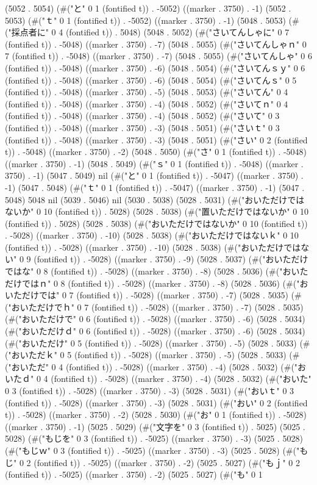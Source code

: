 {{(5052 . 5054) (#("と" 0 1 (fontified t)) . -5052) ((marker . 3750) . -1) (5052 . 5053) (#("ｔ" 0 1 (fontified t)) . -5052) ((marker . 3750) . -1) (5048 . 5053) (#("採点者に" 0 4 (fontified t)) . 5048) (5048 . 5052) (#("さいてんしゃに" 0 7 (fontified t)) . -5048) ((marker . 3750) . -7) (5048 . 5055) (#("さいてんしゃｎ" 0 7 (fontified t)) . -5048) ((marker . 3750) . -7) (5048 . 5055) (#("さいてんしゃ" 0 6 (fontified t)) . -5048) ((marker . 3750) . -6) (5048 . 5054) (#("さいてんｓｙ" 0 6 (fontified t)) . -5048) ((marker . 3750) . -6) (5048 . 5054) (#("さいてんｓ" 0 5 (fontified t)) . -5048) ((marker . 3750) . -5) (5048 . 5053) (#("さいてん" 0 4 (fontified t)) . -5048) ((marker . 3750) . -4) (5048 . 5052) (#("さいてｎ" 0 4 (fontified t)) . -5048) ((marker . 3750) . -4) (5048 . 5052) (#("さいて" 0 3 (fontified t)) . -5048) ((marker . 3750) . -3) (5048 . 5051) (#("さいｔ" 0 3 (fontified t)) . -5048) ((marker . 3750) . -3) (5048 . 5051) (#("さい" 0 2 (fontified t)) . -5048) ((marker . 3750) . -2) (5048 . 5050) (#("さ" 0 1 (fontified t)) . -5048) ((marker . 3750) . -1) (5048 . 5049) (#("ｓ" 0 1 (fontified t)) . -5048) ((marker . 3750) . -1) (5047 . 5049) nil (#("と" 0 1 (fontified t)) . -5047) ((marker . 3750) . -1) (5047 . 5048) (#("ｔ" 0 1 (fontified t)) . -5047) ((marker . 3750) . -1) (5047 . 5048) 5048 nil (5039 . 5046) nil (5030 . 5038) (5028 . 5031) (#("おいただけではないか" 0 10 (fontified t)) . 5028) (5028 . 5038) (#("置いただけではないか" 0 10 (fontified t)) . 5028) (5028 . 5038) (#("おいただけではないか" 0 10 (fontified t)) . -5028) ((marker . 3750) . -10) (5028 . 5038) (#("おいただけではないｋ" 0 10 (fontified t)) . -5028) ((marker . 3750) . -10) (5028 . 5038) (#("おいただけではない" 0 9 (fontified t)) . -5028) ((marker . 3750) . -9) (5028 . 5037) (#("おいただけではな" 0 8 (fontified t)) . -5028) ((marker . 3750) . -8) (5028 . 5036) (#("おいただけではｎ" 0 8 (fontified t)) . -5028) ((marker . 3750) . -8) (5028 . 5036) (#("おいただけでは" 0 7 (fontified t)) . -5028) ((marker . 3750) . -7) (5028 . 5035) (#("おいただけでｈ" 0 7 (fontified t)) . -5028) ((marker . 3750) . -7) (5028 . 5035) (#("おいただけで" 0 6 (fontified t)) . -5028) ((marker . 3750) . -6) (5028 . 5034) (#("おいただけｄ" 0 6 (fontified t)) . -5028) ((marker . 3750) . -6) (5028 . 5034) (#("おいただけ" 0 5 (fontified t)) . -5028) ((marker . 3750) . -5) (5028 . 5033) (#("おいただｋ" 0 5 (fontified t)) . -5028) ((marker . 3750) . -5) (5028 . 5033) (#("おいただ" 0 4 (fontified t)) . -5028) ((marker . 3750) . -4) (5028 . 5032) (#("おいたｄ" 0 4 (fontified t)) . -5028) ((marker . 3750) . -4) (5028 . 5032) (#("おいた" 0 3 (fontified t)) . -5028) ((marker . 3750) . -3) (5028 . 5031) (#("おいｔ" 0 3 (fontified t)) . -5028) ((marker . 3750) . -3) (5028 . 5031) (#("おい" 0 2 (fontified t)) . -5028) ((marker . 3750) . -2) (5028 . 5030) (#("お" 0 1 (fontified t)) . -5028) ((marker . 3750) . -1) (5025 . 5029) (#("文字を" 0 3 (fontified t)) . 5025) (5025 . 5028) (#("もじを" 0 3 (fontified t)) . -5025) ((marker . 3750) . -3) (5025 . 5028) (#("もじｗ" 0 3 (fontified t)) . -5025) ((marker . 3750) . -3) (5025 . 5028) (#("もじ" 0 2 (fontified t)) . -5025) ((marker . 3750) . -2) (5025 . 5027) (#("もｊ" 0 2 (fontified t)) . -5025) ((marker . 3750) . -2) (5025 . 5027) (#("も" 0 1 }}
